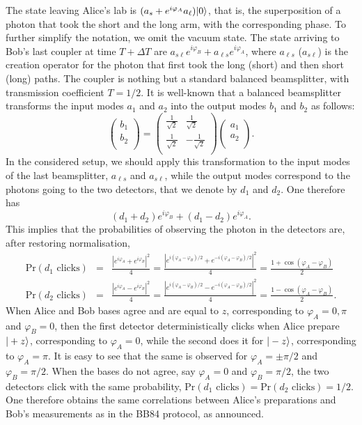 \documentclass[a4paper]{article}
\begin{document}
The state leaving Alice's lab is $(a_s+e^{i\varphi_A}a_\ell)|0\rangle$, that is, the superposition of a photon that took the short and the long arm, with the corresponding phase. To further simplify the notation, we omit the vacuum state. The state arriving to Bob's last coupler at time $T+\Delta T$ are $a_{s\ell}e^{i\varphi_B}+a_{\ell s}e^{i\varphi_A}$, where $a_{\ell s}$ ($a_{s\ell}$) is the creation operator for the photon that first took the long (short) and then short (long) paths. The coupler is nothing but a standard balanced beamsplitter, with transmission coefficient $T=1/2$. It is well-known that a balanced beamsplitter transforms the input modes $a_1$ and $a_2$ into the output modes $b_1$ and $b_2$ as follows:
\begin{equation}
\label{beamsplitter}
    \begin{pmatrix}b_1 \\b_2 \\\end{pmatrix} =     \begin{pmatrix}\frac{1}{\sqrt 2} & \frac{1}{\sqrt 2} \\\frac{1}{\sqrt 2} & -\frac{1}{\sqrt 2} \\\end{pmatrix} \begin{pmatrix}a_1 \\ a_2 \\\end{pmatrix} .
\end{equation}
In the considered setup, we should apply this transformation to the input modes of the last beamsplitter, $a_{\ell s}$ and $a_{s\ell}$, while the output modes correspond to the photons going to the two detectors, that we denote by $d_1$ and $d_2$. One therefore has
\begin{equation}
(d_1+d_2)e^{i\varphi_B}+(d_1-d_2)e^{i\varphi_A}. 
\end{equation}
This implies that the probabilities of observing the photon in the detectors are, after restoring normalisation,
\begin{eqnarray}
\text{Pr}(d_1 \text{ clicks})&=&\frac{|e^{i\varphi_A}+e^{i\varphi_B}|^2}{4}=\frac{|e^{i(\varphi_A-\varphi_B)/2}+e^{-i(\varphi_A-\varphi_B)/2}|^2}{4}=\frac{1+\cos(\varphi_A-\varphi_B)}{2} \nonumber\\
\text{Pr}(d_2 \text{ clicks})&=&\frac{|e^{i\varphi_A}-e^{i\varphi_B}|^2}{4}=\frac{|e^{i(\varphi_A-\varphi_B)/2}-e^{-i(\varphi_A-\varphi_B)/2}|^2}{4}=\frac{1-\cos(\varphi_A-\varphi_B)}{2} .
\end{eqnarray}
When Alice and Bob bases agree and are equal to $z$, corresponding to $\varphi_A=0,\pi$ and $\varphi_B=0$, then the first detector deterministically clicks when Alice prepare $|+z\rangle$, corresponding to $\varphi_A=0$, while the second does it for $|-z\rangle$, corresponding to $\varphi_A=\pi$. It is easy to see that the same is observed for $\varphi_A=\pm\pi/2$ and $\varphi_B=\pi/2$. When the bases do not agree, say $\varphi_A=0$ and $\varphi_B=\pi/2$, the two detectors click with the same probability, $\text{Pr}(d_1 \text{ clicks})=\text{Pr}(d_2 \text{ clicks})=1/2$. One therefore obtains the same correlations between Alice's preparations and Bob's measurements as in the BB84 protocol, as announced.
\end{document}
